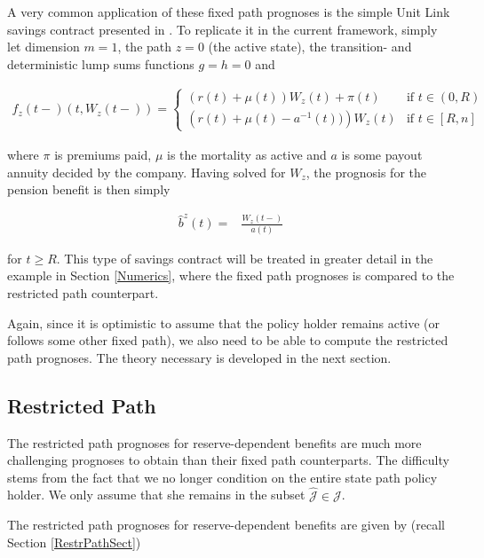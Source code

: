\documentclass{article}
\newcommand{\1}[1]{\mathbbm{1}_{\left\lbrace #1 \right\rbrace}}
\theoremstyle{break}
\theoremstyle{remark}
\newenvironment{remark}
  {\pushQED{\qed}\renewcommand{\qedsymbol}{\scalebox{1.4}{$\circ$}}\remarkx}
  {\popQED\endremarkx}
\numberwithin{equation}{section}
\begin{document}
\begin{remark}
	A very common application of these fixed path prognoses is the simple Unit Link savings contract presented in \cite{Munk}. To replicate it in the current framework, simply let dimension $m=1$, the path $z = 0$ (the active state), the transition- and deterministic lump sums functions $g=h=0$ and

\begin{align*}
	f_z(t-)(t,W_z(t-)) =
	\left\{
	\begin{array}{ll}
		\left( r(t) + \mu(t) \right) W_z(t) + \pi(t) & \mbox{if } t \in (0,R) \\
		\left( r(t) + \mu(t) - a^{-1}(t)) \right) W_z(t) & \mbox{if } t \in [R,n]
	\end{array}
	\right.
\end{align*}

where $\pi$ is premiums paid, $\mu$ is the mortality as active and $a$ is some payout annuity decided by the company. Having solved for $W_z$, the prognosis for the pension benefit is then simply

\begin{align*}
	\hat{b}^{z}(t) =& \frac{W_z(t-)}{a(t)}
\end{align*}

for $t \geq R$. This type of savings contract will be treated in greater detail in the example in Section \ref{Numerics}, where the fixed path prognoses is compared to the restricted path counterpart.
\end{remark}

Again, since it is optimistic to assume that the policy holder remains active (or follows some other fixed path), we also need to be able to compute the restricted path prognoses. The theory necessary is developed in the next section.

\newpage
\subsection{Restricted Path}

The restricted path prognoses for reserve-dependent benefits are much more challenging prognoses to obtain than their fixed path counterparts. The difficulty stems from the fact that we no longer condition on the entire state path policy holder. We only assume that she remains in the subset $\hat{\mathcal{J}} \in \mathcal{J}$.

The restricted path prognoses for reserve-dependent benefits are given by (recall Section \ref{RestrPathSect})
\end{document}
